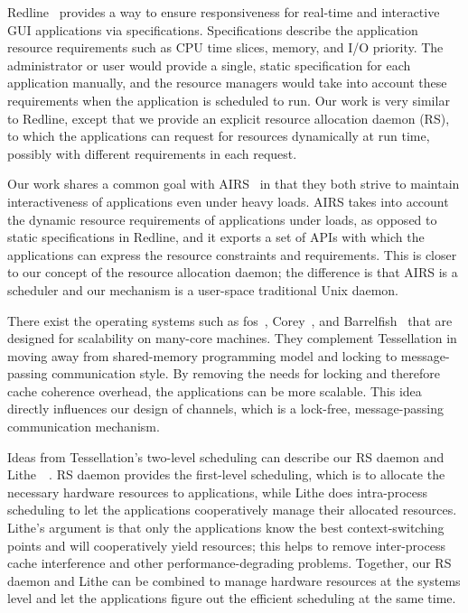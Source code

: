 \documentclass[letterpaper,twocolumn,11pt]{article}
\begin{document}
Redline~\cite{DBLP:conf/osdi/YangLBKM08} provides a way to ensure responsiveness for real-time and interactive GUI applications via specifications. Specifications describe the application resource requirements such as CPU time slices, memory, and I/O priority. The administrator or user would provide a single, static specification for each application manually, and the resource managers would take into account these requirements when the application is scheduled to run. Our work is very similar to Redline, except that we provide an explicit resource allocation daemon (RS), to which the applications can request for resources dynamically at run time, possibly with different requirements in each request.

Our work shares a common goal with AIRS~\cite{kato:airs:} in that they both strive to maintain interactiveness of applications even under heavy loads. AIRS takes into account the dynamic resource requirements of applications under loads, as opposed to static specifications in Redline, and it exports a set of APIs with which the applications can express the resource constraints and requirements. This is closer to our concept of the resource allocation daemon; the difference is that AIRS is a scheduler and our mechanism is a user-space traditional Unix daemon.

There exist the operating systems such as fos~\cite{Wentzlaff:2009:FOS:1531793.1531805}, Corey~\cite{Boyd-Wickizer:2008:COS:1855741.1855745}, and Barrelfish~\cite{Schüpbach08embracingdiversity} that are designed for scalability on many-core machines. They complement Tessellation in moving away from shared-memory programming model and locking to message-passing communication style. By removing the needs for locking and therefore cache coherence overhead, the applications can be more scalable. This idea directly influences our design of channels, which is a lock-free, message-passing communication mechanism.

Ideas from Tessellation's two-level scheduling can describe our RS daemon and Lithe~\cite{Pan:2010:CPS:1809028.1806639}~\cite{Pan:2010:CPS:1806596.1806639}. RS daemon provides the first-level scheduling, which is to allocate the necessary hardware resources to applications, while Lithe does intra-process scheduling to let the applications cooperatively manage their allocated resources. Lithe's argument is that only the applications know the best context-switching points and will cooperatively yield resources; this helps to remove inter-process cache interference and other performance-degrading problems. Together, our RS daemon and Lithe can be combined to manage hardware resources at the systems level and let the applications figure out the efficient scheduling at the same time.
\end{document}
